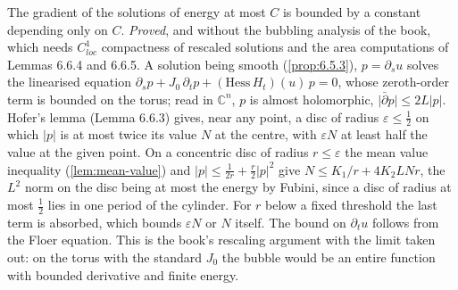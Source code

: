 \begin{proposition}
  \label{prop:6.6.2}
  \leanok
  The gradient of the solutions of energy at most $C$ is bounded by a constant
  depending only on $C$.  \emph{Proved}, and without the bubbling analysis of the
  book, which needs $C^1_{loc}$ compactness of rescaled solutions and the area
  computations of Lemmas 6.6.4 and 6.6.5.  A solution being smooth
  (\ref{prop:6.5.3}), $p = \partial_s u$ solves the linearised equation
  $\partial_s p + J_0\,\partial_t p + (\mathrm{Hess}\,H_t)(u)\,p = 0$, whose
  zeroth-order term is bounded on the torus; read in $\mathbb{C}^n$, $p$ is
  almost holomorphic, $\lvert\bar\partial p\rvert \le 2L\lvert p\rvert$.  Hofer's
  lemma (Lemma 6.6.3) gives, near any point, a disc of radius
  $\varepsilon \le \tfrac12$ on which $\lvert p\rvert$ is at most twice its value
  $N$ at the centre, with $\varepsilon N$ at least half the value at the given
  point.  On a concentric disc of radius $r \le \varepsilon$ the mean value
  inequality (\ref{lem:mean-value}) and
  $\lvert p\rvert \le \tfrac1{2r} + \tfrac r2\lvert p\rvert^2$ give
  $N \le K_1/r + 4K_2LNr$, the $L^2$ norm on the disc being at most the energy by
  Fubini, since a disc of radius at most $\tfrac12$ lies in one period of the
  cylinder.  For $r$ below a fixed threshold the last term is absorbed, which
  bounds $\varepsilon N$ or $N$ itself.  The bound on $\partial_t u$ follows from
  the Floer equation.  This is the book's rescaling argument with the limit
  taken out: on the torus with the standard $J_0$ the bubble would be an entire
  function with bounded derivative and finite energy.
\end{proposition}

